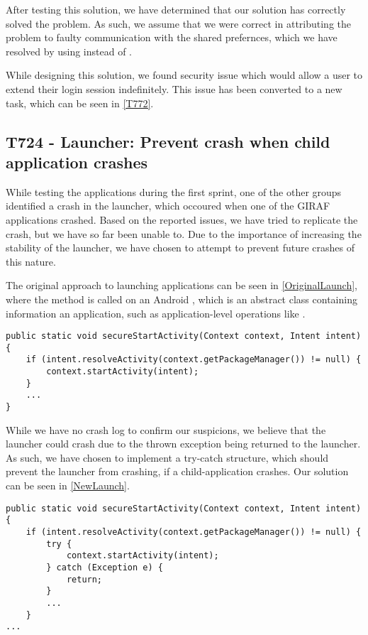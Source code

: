 After testing this solution, we have determined that our solution has correctly
solved the problem. As such, we assume that we were correct in attributing the
problem to faulty communication with the shared prefernces, which we have
resolved by using  instead of .\nl

While designing this solution, we found security issue which would allow a user
to extend their login session indefinitely. This issue has been converted to a
new task, which can be seen in \autoref{T772}.

\subsection{T724 - Launcher: Prevent crash when child application crashes}
While testing the applications during the first sprint, one of the other groups
identified a crash in the launcher, which occoured when one of the GIRAF
applications crashed. Based on the reported issues, we have tried to
replicate the crash, but we have so far been unable to. Due to the importance of
increasing the stability of the launcher, we have chosen to attempt to prevent
future crashes of this nature.\nl

The original approach to launching applications can be seen in
\autoref{OriginalLaunch}, where the  method is called on an
Android , which is an abstract class containing information an
application, such as application-level operations like
.\nl

\begin{minipage}[H]{\linewidth}
\begin{lstlisting}[caption = Original approach to launching applications., label = OriginalLaunch]
public static void secureStartActivity(Context context, Intent intent) {
	if (intent.resolveActivity(context.getPackageManager()) != null) {	
    	context.startActivity(intent);
	}
	...
}
\end{lstlisting}
\end{minipage}

While we have no crash log to confirm our suspicions, we believe that the
launcher could crash due to the thrown exception being returned to the launcher.
As such, we have chosen to implement a try-catch structure, which should prevent
the launcher from crashing, if a child-application crashes. Our solution can be 
seen in \autoref{NewLaunch}.\nl

\begin{minipage}[H]{\linewidth}
\begin{lstlisting}[caption = New approach to launching applications., label = NewLaunch] 
public static void secureStartActivity(Context context, Intent intent) {
	if (intent.resolveActivity(context.getPackageManager()) != null) {
    	try {
        	context.startActivity(intent);
        } catch (Exception e) {
        	return;
        }
        ...
    }
...
\end{lstlisting}
\end{minipage}

